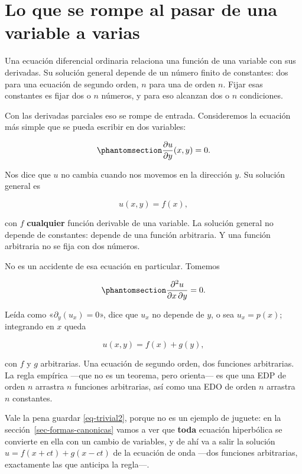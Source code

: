 \documentclass[
  spanish,
  a4paper,
]{scrbook}
\theoremstyle{definition}
\theoremstyle{plain}
\theoremstyle{definition}
\theoremstyle{plain}
\theoremstyle{definition}
\theoremstyle{remark}
\begin{document}
\section{Lo que se rompe al pasar de una variable a
varias}\label{sec-porque}

Una ecuación diferencial ordinaria relaciona una función de una variable
con sus derivadas. Su solución general depende de un número finito de
constantes: dos para una ecuación de segundo orden, \(n\) para una de
orden \(n\). Fijar esas constantes es fijar dos o \(n\) números, y para
eso alcanzan dos o \(n\) condiciones.

Con las derivadas parciales eso se rompe de entrada. Consideremos la
ecuación más simple que se pueda escribir en dos variables:

\begin{equation}\protect\phantomsection\label{eq-trivial}{
\frac{\partial u}{\partial y}(x,y) = 0 .
}\end{equation}

Nos dice que \(u\) no cambia cuando nos movemos en la dirección \(y\).
Su solución general es

\[
u(x,y) = f(x),
\]

con \(f\) \textbf{cualquier} función derivable de una variable. La
solución general no depende de constantes: depende de una función
arbitraria. Y una función arbitraria no se fija con dos números.

No es un accidente de esa ecuación en particular. Tomemos

\begin{equation}\protect\phantomsection\label{eq-trivial2}{
\frac{\partial^2 u}{\partial x\,\partial y} = 0 .
}\end{equation}

Leída como «\(\partial_y(u_x) = 0\)», dice que \(u_x\) no depende de
\(y\), o sea \(u_x = p(x)\); integrando en \(x\) queda

\[
u(x,y) = f(x) + g(y),
\]

con \(f\) y \(g\) arbitrarias. Una ecuación de segundo orden, dos
funciones arbitrarias. La regla empírica ---que no es un teorema, pero
orienta--- es que una EDP de orden \(n\) arrastra \(n\) funciones
arbitrarias, así como una EDO de orden \(n\) arrastra \(n\) constantes.

Vale la pena guardar \ref{eq-trivial2}, porque no es un ejemplo de
juguete: en la sección~\ref{sec-formas-canonicas} vamos a ver que
\textbf{toda} ecuación hiperbólica se convierte en ella con un cambio de
variables, y de ahí va a salir la solución \(u = f(x+ct) + g(x-ct)\) de
la ecuación de onda ---dos funciones arbitrarias, exactamente las que
anticipa la regla---.
\end{document}
